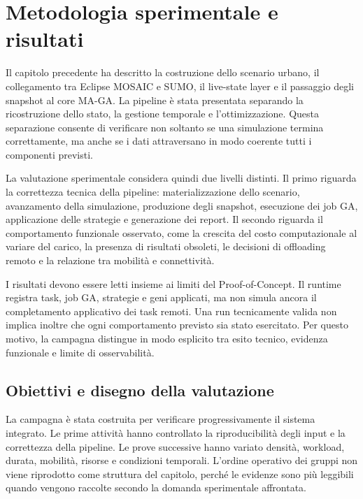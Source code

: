 \chapter{Metodologia sperimentale e risultati}
\label{chap:metodologia_risultati}

Il capitolo precedente ha descritto la costruzione dello scenario urbano, il collegamento tra Eclipse MOSAIC e SUMO, il live-state layer e il passaggio degli snapshot al core MA-GA. La pipeline è stata presentata separando la ricostruzione dello stato, la gestione temporale e l'ottimizzazione. Questa separazione consente di verificare non soltanto se una simulazione termina correttamente, ma anche se i dati attraversano in modo coerente tutti i componenti previsti.

La valutazione sperimentale considera quindi due livelli distinti. Il primo riguarda la correttezza tecnica della pipeline: materializzazione dello scenario, avanzamento della simulazione, produzione degli snapshot, esecuzione dei job GA, applicazione delle strategie e generazione dei report. Il secondo riguarda il comportamento funzionale osservato, come la crescita del costo computazionale al variare del carico, la presenza di risultati obsoleti, le decisioni di offloading remoto e la relazione tra mobilità e connettività.

I risultati devono essere letti insieme ai limiti del Proof-of-Concept. Il runtime registra task, job GA, strategie e geni applicati, ma non simula ancora il completamento applicativo dei task remoti. Una run tecnicamente valida non implica inoltre che ogni comportamento previsto sia stato esercitato. Per questo motivo, la campagna distingue in modo esplicito tra esito tecnico, evidenza funzionale e limite di osservabilità.

\section{Obiettivi e disegno della valutazione}
\label{sec:exp_disegno}

La campagna è stata costruita per verificare progressivamente il sistema integrato. Le prime attività hanno controllato la riproducibilità degli input e la correttezza della pipeline. Le prove successive hanno variato densità, workload, durata, mobilità, risorse e condizioni temporali. L'ordine operativo dei gruppi non viene riprodotto come struttura del capitolo, perché le evidenze sono più leggibili quando vengono raccolte secondo la domanda sperimentale affrontata.

